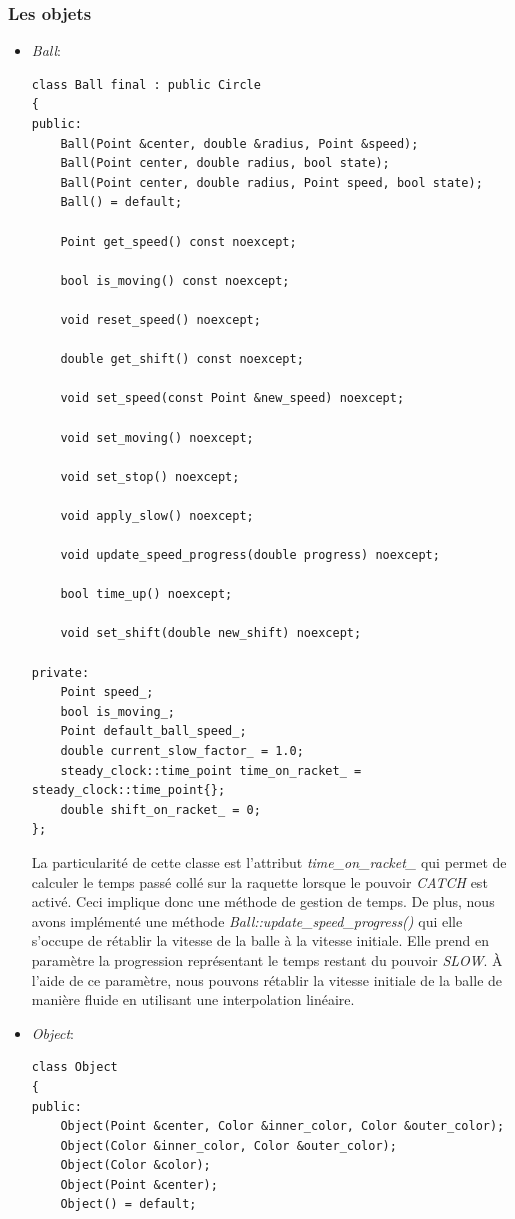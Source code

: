 \documentclass[utf8]{article}
\begin{document}
\subsubsection{Les objets}
\begin{itemize}
    \item \emph{Ball}:
    \begin{verbatim}
class Ball final : public Circle
{
public:
    Ball(Point &center, double &radius, Point &speed);
    Ball(Point center, double radius, bool state);
    Ball(Point center, double radius, Point speed, bool state);
    Ball() = default;
    
    Point get_speed() const noexcept;

    bool is_moving() const noexcept;

    void reset_speed() noexcept;

    double get_shift() const noexcept;

    void set_speed(const Point &new_speed) noexcept;

    void set_moving() noexcept;

    void set_stop() noexcept;

    void apply_slow() noexcept;

    void update_speed_progress(double progress) noexcept;

    bool time_up() noexcept;

    void set_shift(double new_shift) noexcept;

private:
    Point speed_;
    bool is_moving_;
    Point default_ball_speed_;
    double current_slow_factor_ = 1.0;
    steady_clock::time_point time_on_racket_ = steady_clock::time_point{};
    double shift_on_racket_ = 0;
};
    \end{verbatim}
    La particularité de cette classe est l'attribut \emph{time\_on\_racket\_} qui permet de calculer le temps passé collé sur la raquette lorsque le pouvoir \emph{CATCH} est activé. Ceci implique donc une méthode de gestion de temps. De plus, nous avons implémenté une méthode \emph{Ball::update\_speed\_progress()} qui elle s'occupe de rétablir la vitesse de la balle à la vitesse initiale. Elle prend en paramètre la progression représentant le temps restant du pouvoir \emph{SLOW}. À l'aide de ce paramètre, nous pouvons rétablir la vitesse initiale de la balle de manière fluide en utilisant une interpolation linéaire. \\

    \item \emph{Object}:
    \begin{verbatim}
class Object
{
public:
    Object(Point &center, Color &inner_color, Color &outer_color);
    Object(Color &inner_color, Color &outer_color);
    Object(Color &color);
    Object(Point &center);
    Object() = default;


\end{verbatim}
\end{itemize}
\end{document}
